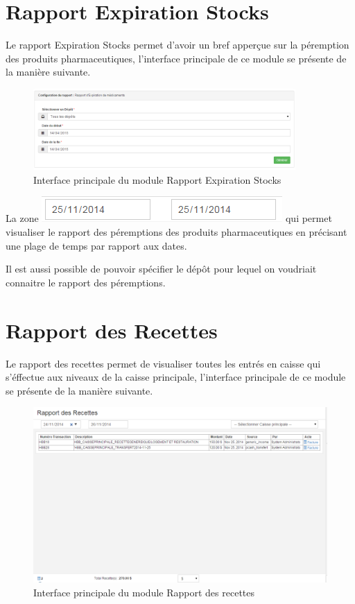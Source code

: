 \documentclass[12pt,a4paper]{report}
\begin{document}
\newpage
\section{Rapport Expiration Stocks}
Le rapport Expiration Stocks permet d'avoir un bref apperçue sur la péremption des produits pharmaceutiques, l'interface principale de ce module se présente de la manière suivante.

\begin{figure}[h]
\begin{center}
\includegraphics[width=10cm]{pic/RappExMedi.png}
\end{center}
\caption{Interface principale du module Rapport Expiration Stocks}
\label{Interface principale du module Rapport Expiration Stocks}
\end{figure}

La zone  \includegraphics[scale=0.7]{pic/PlageTimes.png} qui permet visualiser le rapport des péremptions des produits pharmaceutiques en précisant une plage de temps par rapport aux dates.

Il est aussi possible de pouvoir spécifier le dépôt pour lequel on voudriait connaitre le rapport des péremptions.

\newpage
\section{Rapport des Recettes}
Le rapport des recettes permet de visualiser toutes les entrés en caisse qui s'éffectue aux niveaux de la caisse principale, l'interface principale de ce module se présente de la manière suivante.

\begin{figure}[h]
\begin{center}
\includegraphics[width=14cm]{pic/RapportRecette.png}
\end{center}
\caption{Interface principale du module Rapport des recettes}
\label{Interface principale du module Rapport des recettes}
\end{figure}
\end{document}
